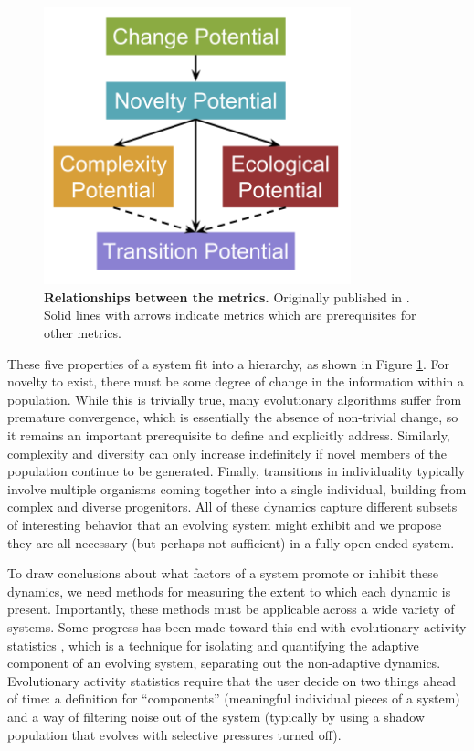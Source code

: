 \documentclass[letterpaper]{article}
\begin{document}
\begin{figure}
\includegraphics[width=3.5in]{figs/Complexity_Barriers.png}
\caption{\textbf{Relationships between the metrics.} Originally published in \citep{blogpost}. Solid lines with arrows indicate metrics which are prerequisites for other metrics.}
\label{hierarchy}
\end{figure}
These five properties of a system fit into a hierarchy, as shown in Figure \ref{hierarchy}. For novelty to exist, there must be some degree of change in the information within a population. While this is trivially true, many evolutionary algorithms suffer from premature convergence, which is essentially the absence of non-trivial change, so it remains an important prerequisite to define and explicitly address. Similarly, complexity and diversity can only increase indefinitely if novel members of the population continue to be generated. Finally, transitions in individuality typically involve multiple organisms coming together into a single individual, building from complex and diverse progenitors.  All of these dynamics capture different subsets of interesting behavior that an evolving system might exhibit and we propose they are all necessary (but perhaps not sufficient) in a fully open-ended system.

To draw conclusions about what factors of a system promote or inhibit these dynamics, we need methods for measuring the extent to which each dynamic is present. Importantly, these methods must be applicable across a wide variety of systems. Some progress has been made toward this end with evolutionary activity statistics \citep{bedau_classification_1998, channon_passing_2001}, which is a technique for isolating and quantifying the adaptive component of an evolving system, separating out the non-adaptive dynamics. Evolutionary activity statistics require that the user decide on two things ahead of time: a definition for ``components'' (meaningful individual pieces of a system) and a way of filtering noise out of the system (typically by using a shadow population that evolves with selective pressures turned off). 
\end{document}

